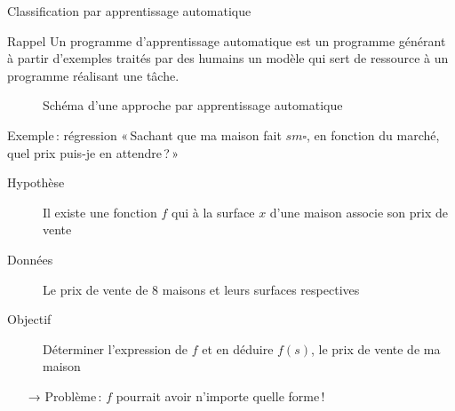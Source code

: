 \documentclass[hyperref={unicode}, xcolor={svgnames}, french]{beamer}
\begin{document}
\begin{frame}{Classification par apprentissage automatique}
    \begin{block}{Rappel}
        Un programme d'apprentissage automatique est un programme générant à partir d'\textcolor{highlight7}{exemples} traités par des humains un \textcolor{highlight3}{modèle} qui sert de ressource à un \textcolor{highlighta}{programme} réalisant une tâche.
    \end{block}
    \begin{figure}
        \tikzset{external/export=true}
        \caption{Schéma d'une approche par apprentissage automatique}
    \end{figure}
\end{frame}

\begin{frame}{Exemple : régression}
    « Sachant que ma maison fait $s\si{m\square}$, en fonction du marché, quel prix puis-je en attendre ? »
    \begin{description}
        \item[Hypothèse] Il existe une fonction $f$ qui à la surface $x$ d'une maison associe son prix de vente
        \item[Données] Le prix de vente de $8$ maisons et leurs surfaces respectives
        \item[Objectif] Déterminer l'expression de $f$ et en déduire $f(s)$, le prix de vente de ma maison
    \end{description}
    \begin{itemize}
        \item[→] Problème : $f$ pourrait avoir n'importe quelle forme !
    \end{itemize}
\end{frame}
\end{document}
